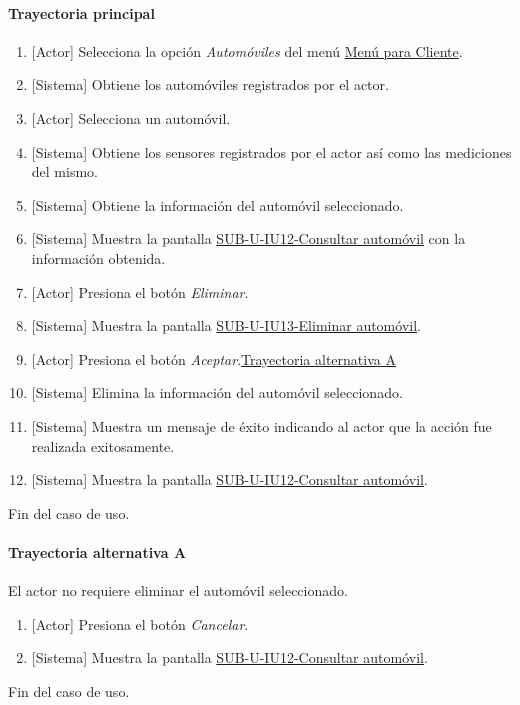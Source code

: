 \paragraph{Trayectoria principal}
	\begin{enumerate}
		\item {[Actor]} Selecciona la opción \textit{Automóviles} del menú \hyperref[fig:menu-cliente]{Menú para Cliente}.
		\item {[Sistema]} Obtiene los automóviles registrados por el actor.
		\item {[Actor]} Selecciona un automóvil.
		\item {[Sistema]} Obtiene los sensores registrados por el actor así como las mediciones del mismo.
		\item {[Sistema]} Obtiene la información del automóvil seleccionado.
		\item {[Sistema]} Muestra la pantalla \hyperref[fig:sub-u-iu12]{SUB-U-IU12-Consultar automóvil} con la información obtenida.
		\item {[Actor]} Presiona el botón \textit{Eliminar}.
		\item {[Sistema]} Muestra la pantalla \hyperref[fig:sub-u-iu13]{SUB-U-IU13-Eliminar automóvil}.
		\item {[Actor]} Presiona el botón \textit{Aceptar}.\hyperref[SUB-U-CU13:TA]{Trayectoria alternativa A}
		\item {[Sistema]} Elimina la información del automóvil seleccionado.
		\item {[Sistema]} Muestra un mensaje de éxito indicando al actor que la acción fue realizada exitosamente.
		\item \label{SUB-U-CU13:Pantalla} {[Sistema]} Muestra la pantalla \hyperref[fig:sub-u-iu12]{SUB-U-IU12-Consultar automóvil}.
	\end{enumerate}
	Fin del caso de uso.

\paragraph{Trayectoria alternativa A} \label{SUB-U-CU13:TA}
	El actor no requiere eliminar el automóvil seleccionado.
	\begin{enumerate}[label=A\arabic*.]
		\item {[Actor]} Presiona el botón \textit{Cancelar}.
		\item {[Sistema]} Muestra la pantalla \hyperref[fig:sub-u-iu12]{SUB-U-IU12-Consultar automóvil}.
	\end{enumerate}
	Fin del caso de uso.
